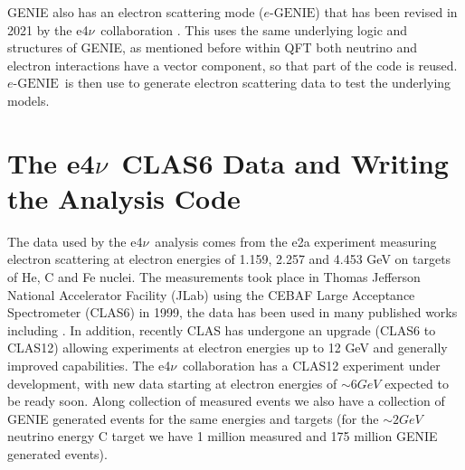 \documentclass[a4paper,12pt]{article}
\newcommand{\efn}{e4$\nu$}
\newcommand{\eGEN}{$e\text{-GENIE}$}
\begin{document}
GENIE also has an electron scattering mode (\eGEN) that has been revised in 2021 by the \efn\ collaboration \cite{e4ncollaborationInclusiveElectronScattering2021}.
This uses the same underlying logic and structures of GENIE, as mentioned before within QFT both neutrino and electron interactions have a vector component, so that part of the code is reused.
\eGEN\ is then use to generate electron scattering data to test the underlying models.

\section{The \efn\ CLAS6 Data and Writing the Analysis Code}
The data used by the \efn\ analysis comes from the e2a experiment measuring electron scattering at electron energies of 1.159, 2.257 and 4.453 \si{GeV} on targets of He, C and Fe nuclei.
The measurements took place in Thomas Jefferson National Accelerator Facility (JLab) using the CEBAF Large Acceptance Spectrometer (CLAS6) \cite{meckingCEBAFLargeAcceptance2003} in 1999, the data has been used in many published works including \cite{khachatryanElectronbeamEnergyReconstruction2021}.
In addition, recently CLAS has undergone an upgrade (CLAS6 to CLAS12) \cite{burkertCLAS12SpectrometerJefferson2020} allowing experiments at electron energies up to 12 \si{GeV} and generally improved capabilities.
The \efn\ collaboration has a CLAS12 experiment under development, with new data starting at electron energies of $\sim6 \si{GeV}$ expected to be ready soon.
Along collection of measured events we also have a collection of GENIE generated events for the same energies and targets (for the $\sim 2\si{GeV}$ neutrino energy C target we have 1 million measured and 175 million GENIE generated events).
\end{document}
